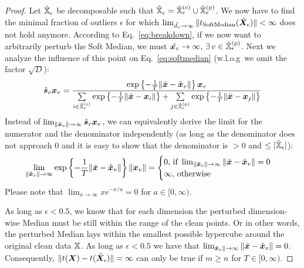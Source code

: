 \documentclass[sigconf, review]{acmart}
\newcommand{\features}{\mX}
\newcommand{\featset}{\sX}
\newcommand{\softout}{\vs}
\newcommand{\pertm}{\tilde{\mX}_\epsilon}
\newcommand{\pertmset}{\tilde{\sX}_\epsilon}
\begin{document}
\begin{proof}\label{proof:actual_soft_median}
  Let \( \pertmset \) be decomposable such that \(\pertmset = \pertmset^{(\text{c})} \cup \pertmset^{(\text{p})} \). We now have to find the minimal fraction of outliers \(\epsilon\) for which \newline\(\lim_{\tilde{\evd_{v}} \to \infty} \|t_{\text{SoftMedian}}(\pertm)\| < \infty\) does not hold anymore. According to Eq.~\ref{eq:breakdown}, if we now want to arbitrarily perturb the Soft Median, 
  we must \(\tilde{\vx_{v}} \to \infty ,\,\exists\, v \in \pertmset^{(\text{p})}\). Next we analyze the influence of this point on Eq.~\ref{eq:softmedian} (w.l.o.g\ we omit the factor \(\sqrt{D}\)):
  \[
    \begin{aligned}
      \hat{\softout}_{v} \vx_{v}
      &= \frac{\exp \left\{-\frac{1}{T} \|\bar{\vx} - \tilde{\vx}_{v}\| \right\} \vx_{v}}{\sum\limits_{i \in \pertmset^{(\text{c})}} \exp \left \{-\frac{1}{T} \|\bar{\vx} - \vx_{i}\| \right\} + \sum\limits_{j \in \pertmset^{(\text{p})}} \exp \left \{-\frac{1}{T} \|\bar{\vx} - \vx_{j}\| \right\}} \\
    \end{aligned}
  \]
  Instead of \(\lim_{\|\tilde{\vx}_{v}\| \to \infty} \hat{\softout}_{v} \vx_{v}\), we can equivalently derive the limit for the numerator and the denominator independently (as long as the denominator does not approach 0 and it is easy to show that the denominator is \(> 0\) and \(\le |\pertmset|\)):
  \[
    \begin{aligned}
      \lim_{\|\tilde{{\bm{x}}}_{v}\| \to \infty} \exp \left\{-\frac{1}{T} \|\bar{{\bm{x}}} - \tilde{{\bm{x}}}_{v}\| \right\} \|{\bm{x}}_{v}\| = 
      \begin{cases}
        0 \text{, if } \lim_{\|\tilde{{\bm{x}}}_{v}\| \to \infty} \|\bar{{\bm{x}}} - \tilde{{\bm{x}}}_{v}\| = 0\\
        \infty\text{, otherwise}
      \end{cases}
    \end{aligned}
  \]
  Please note that \(\lim_{x \to \infty} x e^{-x/a} = 0\) for \(a \in [0, \infty)\). 
  
  As long as \(\epsilon < 0.5\), we know that for each dimension the perturbed dimension-wise Median must be still within the range of the clean points. Or in other words, the perturbed Median lays within the smallest possible hypercube around the original clean data \(\featset\). As long as \(\epsilon < 0.5\) we have that \(\lim_{\tilde{{\bm{x}}}_{v}\| \to \infty} \|\bar{{\bm{x}}} - \tilde{{\bm{x}}}_{v}\| = 0\). Consequently, \(\|t(\features)-t(\pertm)\| = \infty\) can only be true if \(m \ge n\) for \(T \in [0, \infty)\).
\end{proof}
\end{document}
